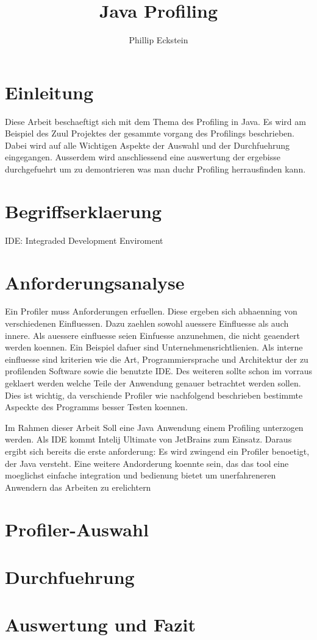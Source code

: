 \documentclass{article}
\author{Phillip Eckstein}
\title{Java Profiling}
\begin{document}
    
\maketitle
\tableofcontents

\pagebreak

\section{Einleitung}
Diese Arbeit beschaeftigt sich mit dem Thema des Profiling in Java. Es wird am Beispiel des Zuul Projektes der gesammte vorgang des Profilings beschrieben. Dabei wird auf alle Wichtigen Aspekte der Auswahl und der Durchfuehrung eingegangen. Ausserdem wird anschliessend eine auswertung der ergebisse durchgefuehrt um zu demontrieren was man duchr Profiling herrausfinden kann. 

\section{Begriffserklaerung}
IDE: Integraded Development Enviroment

\section{Anforderungsanalyse}
Ein Profiler muss Anforderungen erfuellen. Diese ergeben sich abhaenning von verschiedenen Einfluessen. Dazu zaehlen sowohl auessere Einfluesse als auch innere. Als auessere einfluesse seien Einfuesse anzunehmen, die nicht geaendert werden koennen. Ein Beispiel dafuer sind Unternehmensrichtlienien. Als interne einfluesse sind kriterien wie die Art, Programmiersprache und  Architektur der zu profilenden Software sowie die benutzte IDE. Des weiteren sollte schon im vorraus geklaert werden welche Teile der Anwendung genauer betrachtet werden sollen. Dies ist wichtig, da verschiende Profiler wie nachfolgend beschrieben bestimmte Aspeckte des Programms besser Testen koennen. 

Im Rahmen dieser Arbeit Soll eine Java Anwendung einem Profiling unterzogen werden. Als IDE kommt Intelij Ultimate von JetBrains zum Einsatz. Daraus ergibt sich bereits die erste anforderung: Es wird zwingend ein Profiler benoetigt, der Java versteht. Eine weitere Andorderung koennte sein, das das tool eine moeglichst einfache integration und bedienung bietet um unerfahreneren Anwendern das Arbeiten zu erelichtern 
\section{Profiler-Auswahl}

\section{Durchfuehrung}

\section{Auswertung und Fazit}
\end{document}

